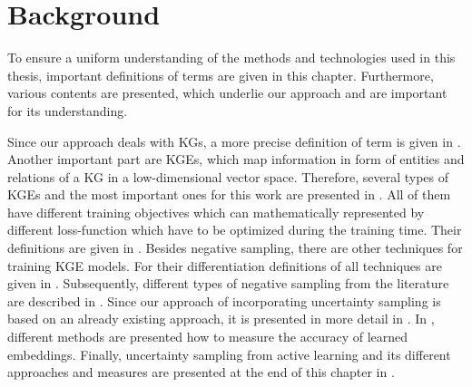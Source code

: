 \chapter{Background}
\label{ch:background}

To ensure a uniform understanding of the methods and technologies used in this thesis, important definitions of terms are given in this chapter.
Furthermore, various contents are presented, which underlie our approach and are important for its understanding.

Since our approach deals with \acp{KG}, a more precise definition of term is given in .
Another important part are \acp{KGE}, which map information in form of entities and relations of a \ac{KG} in a low-dimensional vector space.
Therefore, several types of \acp{KGE} and the most important ones for this work are presented in .
All of them have different training objectives which can mathematically represented by different loss-function which have to be optimized during the training time.
Their definitions are given in .
Besides negative sampling, there are other techniques for training \ac{KGE} models.
For their differentiation definitions of all techniques are given in . 
Subsequently, different types of negative sampling from the literature are described in .
Since our approach of incorporating uncertainty sampling is based on an already existing approach, it is presented in more detail in .
In , different methods are presented how to measure the accuracy of learned embeddings.
Finally, uncertainty sampling from active learning and its different approaches and measures are presented at the end of this chapter in .






























